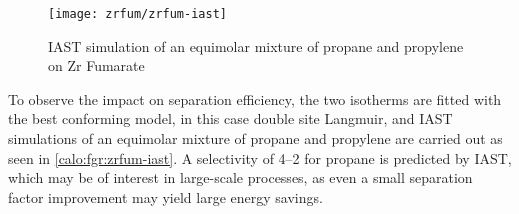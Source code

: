 \begin{figure}[htb]
    \centering
    \texttt{[image: zrfum/zrfum-iast]}
    \caption{IAST simulation of an equimolar mixture of 
    propane and propylene on Zr Fumarate}%
    \label{calo:fgr:zrfum-iast}

\end{figure}

To observe the impact on separation efficiency, the two isotherms 
are fitted with the best conforming model, in this case
double site Langmuir, and IAST simulations of an equimolar mixture
of propane and propylene are carried out as seen in 
\autoref{calo:fgr:zrfum-iast}. A selectivity of 4--2 for 
propane is predicted by IAST, which may be of interest in 
large-scale processes, as even a small separation factor 
improvement may yield large energy savings.


